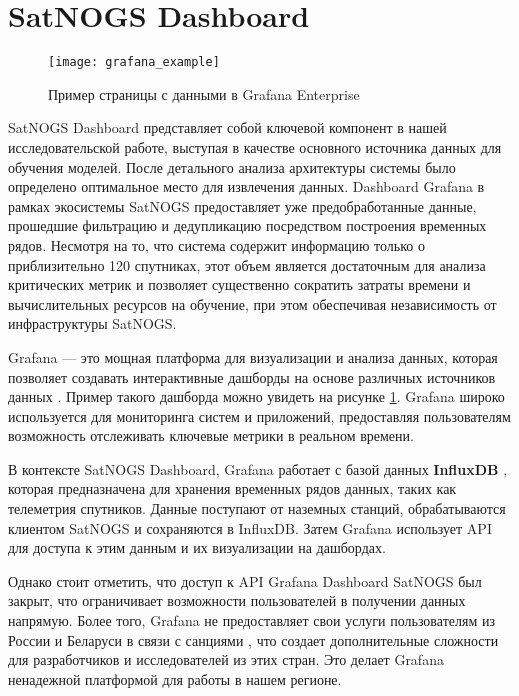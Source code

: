 \section{SatNOGS Dashboard}

\begin{figure}[H]
	\centering
	\texttt{[image: grafana\_example]}
	\caption{Пример страницы с данными в Grafana Enterprise}
	\label{fig:grafana_example}
\end{figure}

SatNOGS Dashboard представляет собой ключевой компонент в нашей
исследовательской работе, выступая в качестве основного источника данных для
обучения моделей. После детального анализа архитектуры системы было определено
оптимальное место для извлечения данных. Dashboard Grafana в рамках экосистемы
SatNOGS предоставляет уже предобработанные данные, прошедшие фильтрацию и
дедупликацию посредством построения временных рядов. Несмотря на то, что
система содержит информацию только о приблизительно 120 спутниках, этот объем
является достаточным для анализа критических метрик и позволяет существенно
сократить затраты времени и вычислительных ресурсов на обучение, при этом
обеспечивая независимость от инфраструктуры SatNOGS.

Grafana — это мощная платформа для визуализации и анализа данных, которая
позволяет создавать интерактивные дашборды на основе различных источников
данных \cite{grafana_docs}. Пример такого дашборда можно увидеть на рисунке
\ref{fig:grafana_example}.
Grafana широко используется для мониторинга систем и приложений, предоставляя
пользователям возможность отслеживать ключевые метрики в реальном времени.

В контексте SatNOGS Dashboard, Grafana работает с базой данных
\textbf{InfluxDB} \cite{influxdb_docs}, которая предназначена для хранения
временных рядов данных, таких как телеметрия спутников. Данные поступают от
наземных станций, обрабатываются клиентом SatNOGS и сохраняются в InfluxDB.
Затем Grafana использует API для доступа к этим данным и их визуализации на
дашбордах.

Однако стоит отметить, что доступ к API Grafana Dashboard SatNOGS был закрыт,
что ограничивает возможности пользователей в получении данных напрямую. Более
того, Grafana не предоставляет свои услуги пользователям из России и Беларуси в
связи с санциями \cite{grafana_community_post}, что создает дополнительные
сложности для разработчиков и исследователей из этих стран. Это делает Grafana
ненадежной платформой для работы в нашем регионе.


